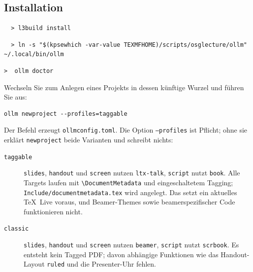\documentclass[
load-preamble+
]{osgdoc}
\begin{document}
\subsection{Installation}
\begin{verbatim}
  > l3build install
\end{verbatim}
\begin{verbatim}
  > ln -s "$(kpsewhich -var-value TEXMFHOME)/scripts/osglecture/ollm" ~/.local/bin/ollm
\end{verbatim}

\begin{verbatim}
>  ollm doctor
\end{verbatim}


Wechseln Sie zum Anlegen eines Projekts in dessen künftige Wurzel und führen
Sie aus:

\begin{verbatim}
ollm newproject --profiles=taggable
\end{verbatim}

Der Befehl erzeugt \texttt{ollmconfig.toml}. Die Option \texttt{--profiles}
ist Pflicht; ohne sie erklärt \texttt{newproject} beide Varianten und schreibt
nichts:

\begin{description}
\item[\texttt{taggable}] \texttt{slides}, \texttt{handout} und
  \texttt{screen} nutzen \texttt{ltx-talk}, \texttt{script} nutzt
  \texttt{book}. Alle Targets laufen mit \verb|\DocumentMetadata| und
  eingeschaltetem Tagging; \texttt{Include/documentmetadata.tex} wird
  angelegt. Das setzt ein aktuelles \TeX\ Live voraus, und Beamer-Themes
  sowie beamerspezifischer Code funktionieren nicht.
\item[\texttt{classic}] \texttt{slides}, \texttt{handout} und
  \texttt{screen} nutzen \texttt{beamer}, \texttt{script} nutzt
  \texttt{scrbook}. Es entsteht kein Tagged PDF; davon abhängige Funktionen
  wie das Handout-Layout \texttt{ruled} und die Presenter-Uhr fehlen.
\end{description}
\end{document}

